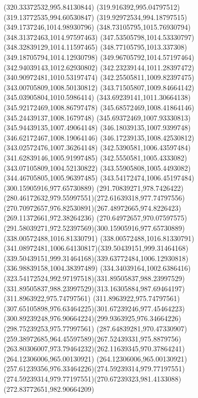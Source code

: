 {{	\lineto(320.33372532,995.84130844)
	\lineto(319.916392,995.04797512)
	\lineto(319.13772535,994.60530847)
	\lineto(319.92972534,994.18797515)
	\closepath
	\moveto(349.1737246,1014.98930796)
	\lineto(348.73105795,1015.76930794)
	\lineto(348.31372463,1014.97597463)
	\lineto(347.53505798,1014.53330797)
	\lineto(348.32839129,1014.11597465)
	\lineto(348.77105795,1013.337308)
	\lineto(349.18705794,1014.12930798)
	\lineto(349.96705792,1014.57197464)
	\closepath
	\moveto(342.94039143,1012.62930802)
	\lineto(342.23239144,1011.28397472)
	\lineto(340.90972481,1010.53197474)
	\lineto(342.25505811,1009.82397475)
	\lineto(343.00705809,1008.50130812)
	\lineto(343.71505807,1009.84664142)
	\lineto(345.03905804,1010.5986414)
	\lineto(343.69239141,1011.30664138)
	\closepath
	\moveto(345.92172469,1008.86797478)
	\lineto(345.68572469,1008.41864146)
	\lineto(345.24439137,1008.1679748)
	\lineto(345.69372469,1007.93330813)
	\lineto(345.94439135,1007.49064148)
	\lineto(346.18039135,1007.9399748)
	\lineto(346.62172467,1008.19064146)
	\lineto(346.17239135,1008.42530812)
	\closepath
	\moveto(343.02572476,1007.36264148)
	\lineto(342.5390581,1006.43597484)
	\lineto(341.62839146,1005.91997485)
	\lineto(342.5550581,1005.4333082)
	\lineto(343.07105809,1004.52130822)
	\lineto(343.55905808,1005.4493082)
	\lineto(344.46705805,1005.96397485)
	\lineto(343.54172474,1006.45197484)
	\closepath
	\moveto(300.15905916,977.65730889)
	\curveto(291.70839271,978.7426422)(280.46172632,979.55997551)(272.61639318,977.74797556)
	\curveto(270.70972657,976.82530891)(267.48972665,974.8226423)(269.11372661,972.38264236)
	\curveto(270.64972657,970.07597575)(291.58039271,972.52397569)(300.15905916,977.65730889)
	\moveto(338.00572488,1016.81330791)
	\curveto(338.00572488,1016.81330791)(341.08972481,1006.64130817)(339.50439151,999.31464168)
	\curveto(339.50439151,999.31464168)(339.63772484,1006.12930818)(336.98839158,1004.38397489)
	\curveto(334.34039164,1002.6386416)(323.54172524,992.97197518)(331.89505837,988.23997529)
	\curveto(331.89505837,988.23997529)(313.16305884,987.69464197)(311.8963922,975.74797561)
	\curveto(311.8963922,975.74797561)(307.65105898,976.63464225)(301.67239246,977.45464223)
	\curveto(300.89239248,976.90664224)(299.9363925,976.34664226)(298.75239253,975.77997561)
	\curveto(287.64839281,970.47330907)(259.38972685,964.45597589)(267.52439331,975.8879756)
	\curveto(263.80306007,973.79464232)(262.11639345,970.37864241)(264.12306006,965.00130921)
	\curveto(264.12306006,965.00130921)(257.61239356,976.33464226)(274.59239314,979.77197551)
	\curveto(274.59239314,979.77197551)(270.67239323,981.4133088)(272.83772651,982.90664209)
}}
